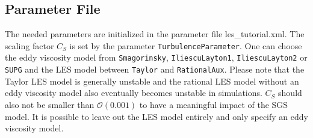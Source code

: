 \documentclass[a4paper, 11pt, twoside]{article}
\begin{document}
\subsection{Parameter File}\label{sectionparameter file}
The needed parameters are initialized in the parameter file les\_tutorial.xml. The scaling factor $C_S$ is set by the parameter \texttt{TurbulenceParameter}. One can choose the eddy viscosity model from \texttt{Smagorinsky}, \texttt{IliescuLayton1}, \texttt{IliescuLayton2} or \texttt{SUPG} and the LES model between \texttt{Taylor} and \texttt{RationalAux}. Please note that the Taylor LES model is generally unstable and the rational LES model  without an eddy viscosity model also eventually becomes unstable in simulations. $C_S$ should also not be smaller than $\mathcal{O}(0.001)$ to have a meaningful impact of the SGS model. It is possible to leave out the LES model entirely and only specify an eddy viscosity model. 
\end{document}
